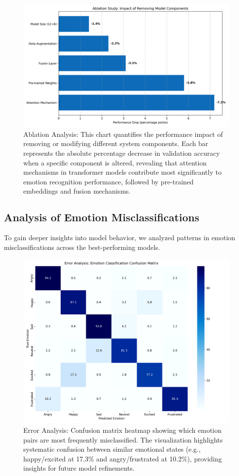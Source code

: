 \documentclass[12pt]{article}
\begin{document}
\begin{figure}[h]
    \centering
    \includegraphics[width=0.9\linewidth]{Figures_Improved/ablation_analysis_improved.png}
    \caption{Ablation Analysis: This chart quantifies the performance impact of removing or modifying different system components. Each bar represents the absolute percentage decrease in validation accuracy when a specific component is altered, revealing that attention mechanisms in transformer models contribute most significantly to emotion recognition performance, followed by pre-trained embeddings and fusion mechanisms.}
    \label{fig:ablation_analysis}
\end{figure}

\subsection{Analysis of Emotion Misclassifications}
To gain deeper insights into model behavior, we analyzed patterns in emotion misclassifications across the best-performing models.

\begin{figure}[h]
    \centering
    \includegraphics[width=0.9\linewidth]{Figures_Improved/error_analysis_improved.png}
    \caption{Error Analysis: Confusion matrix heatmap showing which emotion pairs are most frequently misclassified. The visualization highlights systematic confusion between similar emotional states (e.g., happy/excited at 17.3\% and angry/frustrated at 10.2\%), providing insights for future model refinements.}
    \label{fig:error_analysis}
\end{figure}

\newpage



\end{document}
